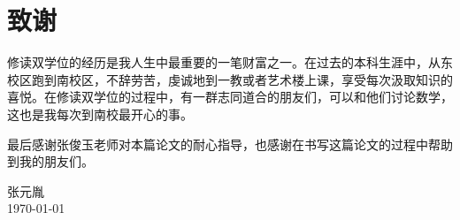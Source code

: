 
\chapter{致谢}

	修读双学位的经历是我人生中最重要的一笔财富之一。在过去的本科生涯中，从东校区跑到南校区，不辞劳苦，虔诚地到一教或者艺术楼上课，享受每次汲取知识的喜悦。在修读双学位的过程中，有一群志同道合的朋友们，可以和他们讨论数学，这也是我每次到南校最开心的事。

	最后感谢张俊玉老师对本篇论文的耐心指导，也感谢在书写这篇论文的过程中帮助到我的朋友们。

\vskip 108pt
\begin{flushright}
	张元胤\makebox[1cm]{} \\
\today
\end{flushright}

